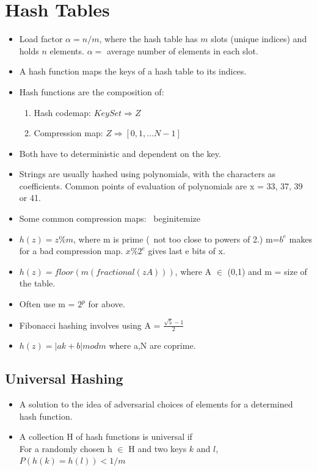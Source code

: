 \documentclass{report}
\begin{document}
\section{Hash Tables}
\begin{itemize}
\item Load factor $\alpha = n/m$, where the hash table has $m$ slots (unique indices)
and holds $n$ elements. $\alpha = $ average number of elements in each slot.
\item A hash function maps the keys of a hash table to its indices.
\item Hash functions are the composition of:
\begin{enumerate}
    \item Hash codemap: $KeySet \Longrightarrow Z$
    \item Compression map: $Z \Longrightarrow [0,1,...N-1]$
\end{enumerate}
\item Both have to deterministic and dependent on the key.
\item Strings are usually hashed using polynomials, with the characters
as coefficients. Common points of evaluation of polynomials are
x = 33, 37, 39 or 41.
\item Some common compression maps:
\
begin{itemize}
    \item $h(z) = z \% m$, where m is prime (~not too close to powers of 2.) m=$b^e$ makes for a bad compression map.
    $x \% 2^e$ gives last e bits of x.
    \item $h(z) = floor(m(fractional(zA)))$, where A $\in$ (0,1) and m = size of the table.
    \item Often use m = $2^p$ for above.
    \item Fibonacci hashing involves using A = $\frac{\sqrt{5}-1}{2}$
    \item $h(z) = |ak+b| mod m$ where a,N are coprime.
\end{itemize}
\subsection{Universal Hashing}
\begin{itemize}
\item A solution to the idea of adversarial choices of elements for a determined hash function.
\item A collection H of hash functions is universal if \\
For a randomly chosen h $\in$ H and two keys $k$ and $l$,\\
$P(h(k)=h(l)) < 1/m$
\end{itemize}
\end{document}
